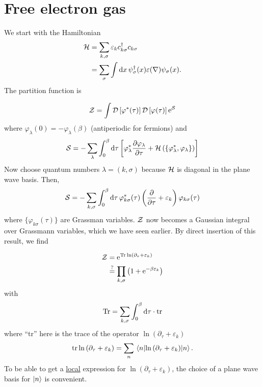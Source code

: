 \section{Free electron gas}
\label{sec:free_electron}

We start with the Hamiltonian
\begin{align}
\mathcal{H} &= \sum_{k,\sigma}\varepsilon_kc_{k\sigma}^\dagger c_{k\sigma}\nonumber \\
& = \sum_\sigma \int \dd{x} \psi_\sigma^\dagger(x)\varepsilon(\nabla)\psi_\sigma(x).
\end{align}
The partition function is 

\begin{equation}
\label{eq:partition_integral}
\mathcal{Z} = \int \mathcal{D}\left[\varphi^*(\tau)\right]\mathcal{D}\left[\varphi(\tau)\right]\mathrm{e}^{\mathcal{S}}
\end{equation}
where \( \varphi_\lambda(0) = -\varphi_\lambda(\beta)\) (antiperiodic for fermions) and
\begin{equation}
\mathcal{S} = -\sum_\lambda\int_0^\beta\dd{\tau}\left[\varphi_\lambda^*\pdv{\varphi_\lambda}{\tau} + \mathcal{H} \left(\{\varphi_\lambda^*, \varphi_\lambda\}\right)\right]
\end{equation}
Now choose quantum numbers \(\lambda = \left(k,\sigma\right)\) because $\mathcal{H}$ is diagonal in the plane wave basis. Then,  
\begin{equation}
\mathcal{S} = -\sum_{k,\sigma}\int_0^\beta\dd{\tau}\varphi_{k\sigma}^*(\tau)\left(\pdv{\tau} + \varepsilon_k\right)\varphi_{k\sigma}(\tau)
\end{equation}
where $\{\varphi_{k\sigma}(\tau)\}$ are Grassman variables. $\mathcal{Z}$ now becomes a Gaussian integral over Grassmann variables, which we have seen earlier. By direct insertion of this result, we find 

\begin{align}
\mathcal{Z} &= \mathrm{e}^{\Tr \ln\left(\partial_\tau + \varepsilon_k\right)} \label{eq:partition_free_electron}\\
&\stackrel{?}{=} \prod_{k,\sigma}\left(1+\mathrm{e}^{-\beta\varepsilon_k}\right)\nonumber
\end{align} 
with 
\begin{equation}
\label{eq:trace_}
\Tr = \sum_{k,\sigma}\int_0^\beta\dd{\tau}\cdot \tr
\end{equation}
where ``tr'' here is the trace of the operator $\ln\left(\partial_\tau + \varepsilon_k\right)$
\begin{equation}
\tr\ln\left(\partial_\tau + \varepsilon_k\right) = \sum_n\ev{\ln\left(\partial_\tau + \varepsilon_k\right)}{n}.
\end{equation}
To be able to get a \underline{local} expression for $\ln\left(\partial_\tau + \varepsilon_k\right)$, the choice of a plane wave basis for $\ket n$ is convenient.

